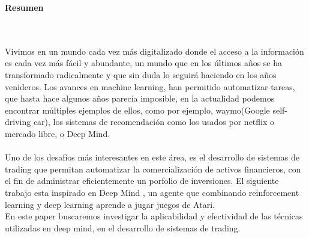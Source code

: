 \begin{center}\huge{\textbf{Resumen}}\end{center}

\noindent
\\
\\
Vivimos en un mundo cada vez más digitalizado donde el acceso a la información es cada vez más fácil y abundante, un mundo que en los últimos años se ha transformado radicalmente y que sin duda lo seguirá haciendo en los años venideros. Los avances en machine learning, han permitido automatizar tareas, que hasta hace algunos años parecía imposible, en la actualidad podemos encontrar múltiples ejemplos de ellos, como por ejemplo, waymo(Google self-driving car), los sistemas de recomendación como los usados por netflix o mercado libre, o Deep Mind.
\\
\\
Uno de los desafíos más interesantes en este área, es el desarrollo de sistemas de trading que permitan automatizar la comercialización de activos financieros, con el fin de administrar eficientemente un porfolio de inversiones.
El siguiente trabajo esta inspirado en Deep Mind \cite{8}, un agente que combinando reinforcement learning y deep learning aprende a jugar juegos de Atari. \\
En este paper buscaremos investigar la aplicabilidad y efectividad de las técnicas utilizadas en deep mind, en el desarrollo de sistemas de trading. 


